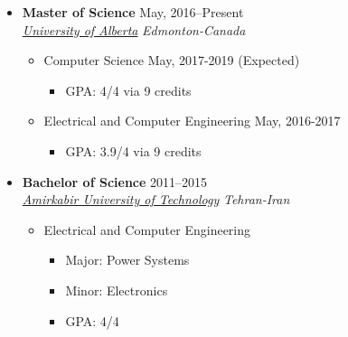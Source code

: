 \documentclass[10pt,a4paper,sans]{moderncv} %
\begin{document}
	\begin{itemize}
		\item \textbf{Master of Science} \hfill May, 2016--Present \\ 
		\href{https://ualberta.ca/}{ \emph{University of Alberta}} \hfill \emph{Edmonton-Canada}
		\begin{itemize}
			\item Computer Science \hspace{10 pt}  \hspace{10 pt}  \hfill  May, 2017-2019 (Expected)
			\begin{itemize}
				\item GPA: 4/4 via 9 credits \\
			\end{itemize}
			\item Electrical and Computer Engineering \hspace{10 pt}  \hspace{10 pt}  \hfill  May, 2016-2017 
			\begin{itemize}
				\item GPA: 3.9/4 via 9 credits \\
			\end{itemize}
		\end{itemize}
		
		
		\item \textbf{Bachelor of Science} \hfill 2011--2015 \\
		\href{http://aut.ac.ir/aut/}{ \emph{Amirkabir University of Technology}} \hfill \emph{Tehran-Iran}
		
		\begin{itemize}
			\item Electrical and Computer Engineering
			\begin{itemize}		
				\item Major: Power Systems \hspace{10 pt} 
				\item Minor: Electronics \hspace{36 pt}   
				\item GPA: 4/4
			\end{itemize}
		\end{itemize}
		
	\end{itemize}
\end{document}
